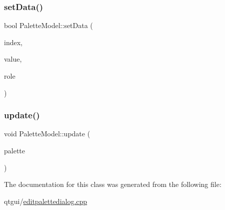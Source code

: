 \subsubsection{\texorpdfstring{setData()}{setData()}}
{\footnotesize\ttfamily bool Palette\+Model\+::set\+Data (\begin{DoxyParamCaption}\item[{const Q\+Model\+Index \&}]{index,  }\item[{const Q\+Variant \&}]{value,  }\item[{int}]{role }\end{DoxyParamCaption})\hspace{0.3cm}{\ttfamily [inline]}}

\mbox{\label{class_palette_model_aaef224b2d98b2edd66849f0822d6301a}} 
\subsubsection{\texorpdfstring{update()}{update()}}
{\footnotesize\ttfamily void Palette\+Model\+::update (\begin{DoxyParamCaption}\item[{\mbox{\hyperlink{class_palette}{Palette}} $\ast$}]{palette }\end{DoxyParamCaption})\hspace{0.3cm}{\ttfamily [inline]}}



The documentation for this class was generated from the following file\+:\begin{DoxyCompactItemize}
\item 
qtgui/\mbox{\hyperlink{editpalettedialog_8cpp}{editpalettedialog.\+cpp}}\end{DoxyCompactItemize}
